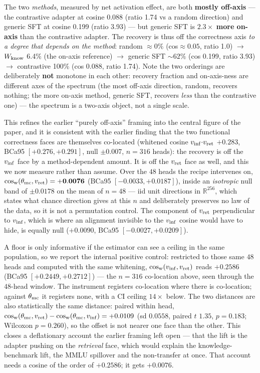 The two \emph{methods}, measured by net activation effect, are both \textbf{mostly
off-axis} --- the contrastive adapter at cosine 0.088 (ratio 1.74 vs a random
direction) and generic SFT at cosine 0.199 (ratio 3.93) --- but generic SFT is
$\mathbf{2.3\times}$ \textbf{more on-axis} than the contrastive adapter. The
recovery is thus off the correctness axis \emph{to a degree that depends on the
method}: random ${\approx}0\%$ (cos${\approx}0.05$, ratio 1.0) $\rightarrow$
$W_{\mathrm{know}}$ 6.4\% (the on-axis reference) $\rightarrow$ generic SFT ${\sim}62\%$ (cos
0.199, ratio 3.93) $\rightarrow$ contrastive 100\% (cos 0.088, ratio 1.74). Note
the two orderings are deliberately \textbf{not} monotone in each other: recovery
fraction and on-axis-ness are different axes of the spectrum (the most off-axis
direction, random, recovers nothing; the more on-axis method, generic SFT, recovers
\emph{less} than the contrastive one) --- the spectrum is a two-axis object, not a
single scale.

This refines the earlier ``purely off-axis'' framing into the central figure of the
paper, and it is consistent with the earlier finding that the two functional
correctness faces are themselves co-located (whitened cosine $v_{\mathrm{inf}}{\cdot}v_{\mathrm{ret}}$
$+0.283$, BCa95 $[+0.276, +0.291]$, null ${\pm}0.007$, $n{=}316$ heads): the
recovery is off the $v_{\mathrm{inf}}$ face by a method-dependent amount. It is off the $v_{\mathrm{ret}}$
face as well, and this we now measure rather than assume. Over the $48$ heads the
recipe intervenes on, $\cos_{\mathrm{w}}(\theta_{\mathrm{mc}},v_{\mathrm{ret}}) = \mathbf{+0.0076}$ (BCa95
$[-0.0033, +0.0187]$), inside an \emph{isotropic} null band of ${\pm}0.0178$ on the
mean of $n{=}48$ --- iid unit directions in $\mathbb{R}^{256}$, which states what
chance direction gives at this $n$ and deliberately preserves no law of the data, so
it is not a permutation control. The component of $v_{\mathrm{ret}}$ perpendicular to $v_{\mathrm{inf}}$,
which is where an alignment invisible to the $v_{\mathrm{inf}}$ cosine would have to hide, is
equally null ($+0.0090$, BCa95 $[-0.0027, +0.0209]$).

A floor is only informative if the estimator can see a ceiling in the same
population, so we report the internal positive control: restricted to those same $48$
heads and computed with the same whitening, $\cos_{\mathrm{w}}(v_{\mathrm{inf}},v_{\mathrm{ret}})$ reads
$\mathbf{+0.2586}$ (BCa95 $[+0.2449, +0.2712]$) --- the $n{=}316$ co-location above,
seen through the $48$-head window. The instrument registers co-location where there
is co-location; against $\theta_{\mathrm{mc}}$ it registers none, with a CI ceiling $14\times$
below. The two distances are also statistically the same distance: paired within
head, $\cos_{\mathrm{w}}(\theta_{\mathrm{mc}},v_{\mathrm{ret}}) - \cos_{\mathrm{w}}(\theta_{\mathrm{mc}},v_{\mathrm{inf}}) = +0.0109$ (sd $0.0558$,
paired $t$ $1.35$, $p=0.183$; Wilcoxon $p=0.260$), so the offset is not nearer one
face than the other. This closes a deflationary account the earlier framing left
open --- that the lift is the adapter pushing on the \emph{retrieval} face, which
would explain the knowledge-benchmark lift, the MMLU spillover and the
non-transfer at once. That account needs a cosine of the order of $+0.2586$; it gets
$+0.0076$.

